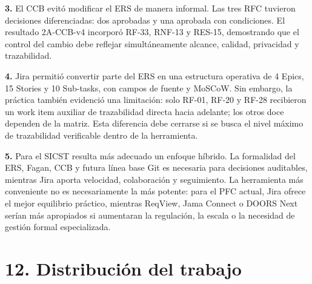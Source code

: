 \documentclass[12pt]{article}
\begin{document}
\textbf{3.} El CCB evitó modificar el ERS de manera informal. Las tres RFC tuvieron decisiones diferenciadas: dos aprobadas y una aprobada con condiciones. El resultado 2A-CCB-v4 incorporó RF-33, RNF-13 y RES-15, demostrando que el control del cambio debe reflejar simultáneamente alcance, calidad, privacidad y trazabilidad.

\textbf{4.} Jira permitió convertir parte del ERS en una estructura operativa de 4 Epics, 15 Stories y 10 Sub-tasks, con campos de fuente y MoSCoW. Sin embargo, la práctica también evidenció una limitación: solo RF-01, RF-20 y RF-28 recibieron un work item auxiliar de trazabilidad directa hacia adelante; los otros doce dependen de la matriz. Esta diferencia debe cerrarse si se busca el nivel máximo de trazabilidad verificable dentro de la herramienta.

\textbf{5.} Para el SICST resulta más adecuado un enfoque híbrido. La formalidad del ERS, Fagan, CCB y futura línea base Git es necesaria para decisiones auditables, mientras Jira aporta velocidad, colaboración y seguimiento. La herramienta más conveniente no es necesariamente la más potente: para el PFC actual, Jira ofrece el mejor equilibrio práctico, mientras ReqView, Jama Connect o DOORS Next serían más apropiados si aumentaran la regulación, la escala o la necesidad de gestión formal especializada.

\section{\texorpdfstring{12. Distribución del trabajo}{12. Distribución del trabajo}}\label{distribuciuxf3n-del-trabajo}
\end{document}
